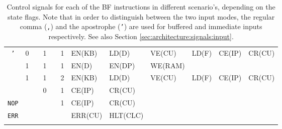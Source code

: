 \begin{landscape}
\begin{longtable}[c] {c|cccc|c|llllll}
    \rowcolor{Gray}  \texttt{'}   & 0 &   & 1     &      & 1     & EN(KB)   & LD(D)    & VE(CU)  & LD(F)  & CE(IP) & CR(CU) \\
    \rowcolor{White}              & 1 &   & 1     &      & 1     & EN(D)    & EN(DP)   & WE(RAM) &        &        &        \\
    \rowcolor{White}              & 1 &   & 1     &      & 2     & EN(KB)   & LD(D)    & VE(CU)  & LD(F)  & CE(IP) & CR(CU) \\
    \rowcolor{Gray}               &   &   & 0     &      & 1     & CE(IP)   & CR(CU)   &         &        &        &        \\ \hline
    \rowcolor{White} \texttt{NOP} &   &   &       &      & 1     & CE(IP)   & CR(CU)   &         &        &        &        \\ \hline
    \rowcolor{Gray}  \texttt{ERR} &   &   &       &      &       & ERR(CU)  & HLT(CLC) &         &        &        &        \\ \hline

    \caption{Control signals for each of the BF instructions in different scenario's, depending on the state flags. Note that in order to distinguish between the two input modes, the regular comma (\texttt{,}) and the apostrophe (\texttt{'}) are used for buffered and immediate inputs respectively. See also Section \ref{sec:architecture:signals:input}.}
    \label{tab:microcode}
  \end{longtable}
\end{landscape}
